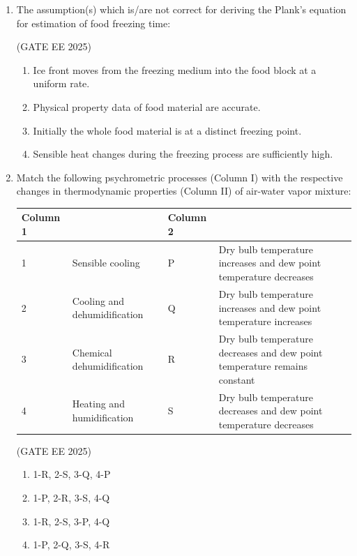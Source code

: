 \documentclass[journal,12pt,onecolumn]{IEEEtran}
\theoremstyle{remark}
\begin{document}
\begin{enumerate}
\item The assumption(s) which is/are not correct for deriving the Plank's equation for estimation of food freezing time:

\hfill(GATE EE 2025)

\begin{enumerate}
\item Ice front moves from the freezing medium into the food block at a uniform rate.
\item Physical property data of food material are accurate.
\item Initially the whole food material is at a distinct freezing point.
\item Sensible heat changes during the freezing process are sufficiently high.
\end{enumerate}

\item Match the following psychrometric processes (Column I) with the respective changes in thermodynamic properties (Column II) of air-water vapor mixture:

\begin{center}
\begin{tabular}{|l|l|l|l|}
\hline
\textbf{Column 1} & & \textbf{Column 2} & \\ \hline
1 & Sensible cooling & P & Dry bulb temperature increases and 
dew point temperature decreases \\ \hline
2 & Cooling and dehumidification & Q & Dry bulb temperature increases and dew point temperature increases \\ \hline
3 & Chemical dehumidification & R & Dry bulb temperature decreases and dew point temperature remains constant \\ \hline
4 & Heating and humidification & S & Dry bulb temperature decreases and dew point temperature decreases\\ \hline

\end{tabular}
\end{center}

\hfill(GATE EE 2025)

\begin{multicols}{2}
\begin{enumerate}
\item 1-R, 2-S, 3-Q, 4-P
\item 1-P, 2-R, 3-S, 4-Q
\item 1-R, 2-S, 3-P, 4-Q
\item 1-P, 2-Q, 3-S, 4-R
\end{enumerate}
\end{multicols}


\end{enumerate}
\end{document}
